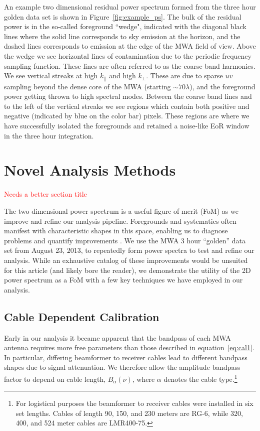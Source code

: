 \documentclass[iop]{emulateapj}
\begin{document}
An example two dimensional residual power spectrum formed from the three hour golden 
data set is shown in Figure~\ref{fig:example_ps}. The bulk of the residual power is in the 
so-called foreground ``wedge", indicated with the diagonal black lines where the solid line 
corresponds to sky emission at the horizon, and the dashed lines corresponds to emission 
at the edge of the MWA field of view. Above the wedge we see horizontal lines of 
contamination due to the periodic frequency sampling function. These lines are often 
referred to as the coarse band harmonics. We see vertical streaks at high $k_{||}$ and high 
$k_{\perp}$. These are due to sparse $uv$ sampling beyond the dense core of the MWA 
(starting $\sim70\lambda$), and the foreground power getting thrown to high spectral 
modes. Between the coarse band lines and to the left of the vertical streaks we see regions 
which contain both positive and negative (indicated by blue on the color bar) pixels. These 
regions are where we have successfully isolated the foregrounds and retained a noise-like 
EoR window in the three hour integration.

\section{Novel Analysis Methods}\label{sec:techniques}
\textcolor{red}{Needs a better section title}

The two dimensional power spectrum is a useful figure of merit (FoM) as we improve and 
refine our analysis pipeline. Foregrounds and systematics often manifest with characteristic 
shapes in this space, enabling us to diagnose problems and quantify improvements 
\citep{Morales:2012}. We use the MWA 3 hour ``golden'' data set from August 23, 2013, to 
repeatedly form power spectra to test and refine our analysis. While an exhaustive catalog 
of these improvements would be unsuited for this article (and likely bore the reader), we 
demonstrate the utility of the 2D power spectrum as a FoM with a few key techniques we 
have employed in our analysis. 

\subsection{Cable Dependent Calibration}\label{sec:cables}

Early in our analysis it became apparent that the bandpass of each MWA antenna requires 
more free parameters than those described in equation~\ref{eq:cal1}. In particular, differing 
beamformer to receiver cables lead to different bandpass shapes due to signal attenuation. 
We therefore allow the amplitude bandpass factor to depend on cable length, $B_{\alpha}
(\nu)$, where $\alpha$ denotes the cable type.\footnote{For logistical purposes the 
beamformer to receiver cables were installed in six set lengths. Cables of length 90, 150, 
and 230 meters are RG-6, while 320, 400, and 524 meter cables are LMR400-75.}
\end{document}
